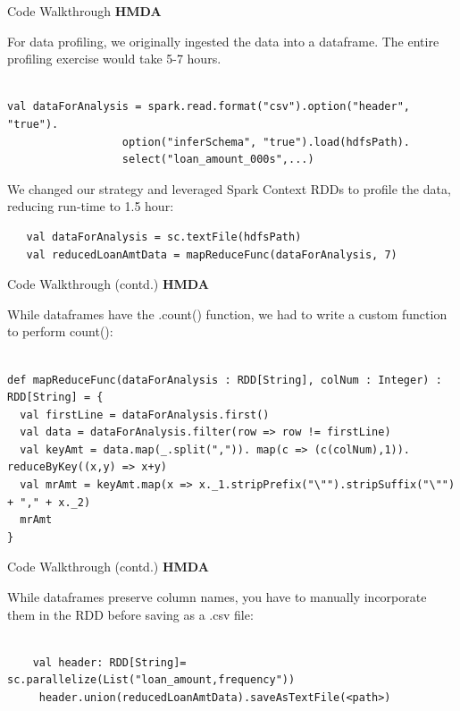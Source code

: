 \documentclass{beamer}
\begin{document}
\begin{frame}[fragile]{Code Walkthrough}
\textbf{HMDA}


For data profiling, we originally ingested the data into a dataframe.  The entire profiling exercise would take 5-7 hours. 
\begin{lstlisting}

val dataForAnalysis = spark.read.format("csv").option("header", "true").  
                  option("inferSchema", "true").load(hdfsPath).
                  select("loan_amount_000s",...)
\end{lstlisting}

We changed our strategy and leveraged Spark Context RDDs to profile the data, reducing run-time to 1.5 hour: 

\begin{lstlisting}
   val dataForAnalysis = sc.textFile(hdfsPath)
   val reducedLoanAmtData = mapReduceFunc(dataForAnalysis, 7)
\end{lstlisting}

\end{frame}


\begin{frame}[fragile]{Code Walkthrough (contd.)}
\textbf{HMDA}

While dataframes have the .count() function, we had to write a custom function to perform count(): 

\begin{lstlisting}

def mapReduceFunc(dataForAnalysis : RDD[String], colNum : Integer) : RDD[String] = {
  val firstLine = dataForAnalysis.first() 
  val data = dataForAnalysis.filter(row => row != firstLine)
  val keyAmt = data.map(_.split(",")). map(c => (c(colNum),1)). reduceByKey((x,y) => x+y)
  val mrAmt = keyAmt.map(x => x._1.stripPrefix("\"").stripSuffix("\"") + "," + x._2)
  mrAmt
}
\end{lstlisting}

\end{frame}


\begin{frame}[fragile]{Code Walkthrough (contd.)}
\textbf{HMDA}

While dataframes preserve column names, you have to manually incorporate them in the RDD before saving as a .csv file:

\begin{lstlisting}

    val header: RDD[String]= sc.parallelize(List("loan_amount,frequency"))
     header.union(reducedLoanAmtData).saveAsTextFile(<path>)

\end{lstlisting}

\end{frame}
\end{document}
